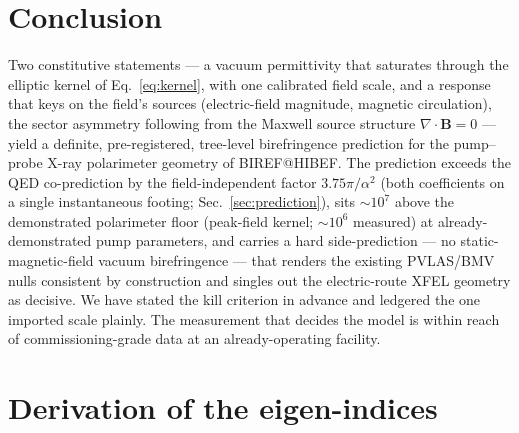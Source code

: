 \documentclass[aps,prd,twocolumn,superscriptaddress,nofootinbib,longbibliography]{revtex4-2}
\begin{document}
\section{Conclusion}

Two constitutive statements --- a vacuum permittivity that saturates through the
elliptic kernel of Eq.~\eqref{eq:kernel}, with one calibrated field scale, and a
response that keys on the field's sources (electric-field magnitude, magnetic
circulation), the sector asymmetry following from the Maxwell source structure
$\nabla\cdot\mathbf B=0$ --- yield a definite, pre-registered, tree-level
birefringence prediction for the pump--probe X-ray polarimeter geometry of
BIREF@HIBEF. The prediction
exceeds the QED co-prediction by the field-independent factor $3.75\pi/\alpha^2$
(both coefficients on a single instantaneous footing; Sec.~\ref{sec:prediction}),
sits $\sim\!10^7$ above the demonstrated polarimeter floor (peak-field kernel;
$\sim\!10^6$ measured) at already-demonstrated
pump parameters, and carries a hard side-prediction --- no static-magnetic-field
vacuum birefringence --- that renders the existing PVLAS/BMV nulls consistent by
construction and singles out the electric-route XFEL geometry as decisive. We
have stated the kill criterion in advance and ledgered the one imported scale
plainly. The measurement that decides the model is within reach of
commissioning-grade data at an already-operating facility.

\appendix

\section{Derivation of the eigen-indices}
\label{app:eigen}
\end{document}

